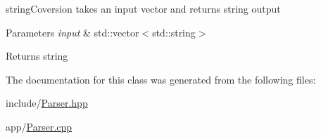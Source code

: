 string\-Coversion takes an input vector and returns string output 


\begin{DoxyParams}{Parameters}
{\em input} & std\-::vector$<$std\-::string$>$ \\
\hline
\end{DoxyParams}
\begin{DoxyReturn}{Returns}
string 
\end{DoxyReturn}


The documentation for this class was generated from the following files\-:\begin{DoxyCompactItemize}
\item 
include/\hyperlink{Parser_8hpp}{Parser.\-hpp}\item 
app/\hyperlink{Parser_8cpp}{Parser.\-cpp}\end{DoxyCompactItemize}
